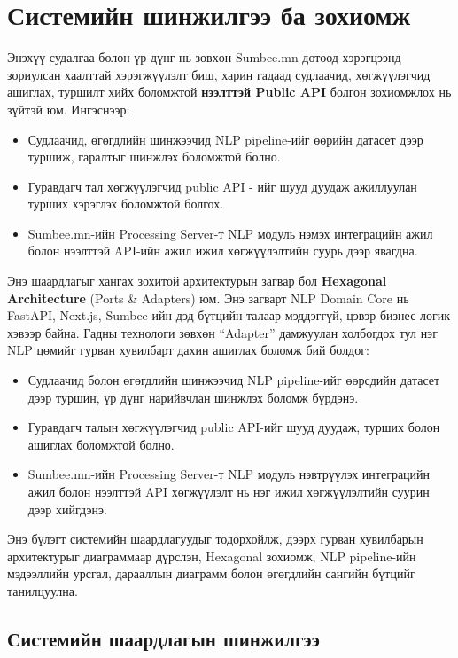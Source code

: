 \chapter{Системийн шинжилгээ ба зохиомж}

 Энэхүү судалгаа болон үр дүнг нь зөвхөн Sumbee.mn дотоод хэрэгцээнд зориулсан хаалттай хэрэгжүүлэлт биш, харин гадаад судлаачид, хөгжүүлэгчид ашиглах, туршилт хийх боломжтой \textbf{нээлттэй Public API} болгон зохиомжлох нь зүйтэй юм. Ингэснээр:

\begin{itemize}
    \item Судлаачид, өгөгдлийн шинжээчид NLP pipeline-ийг өөрийн датасет дээр туршиж, гаралтыг шинжлэх боломжтой болно.
    \item Гуравдагч тал хөгжүүлэгчид public API - ийг шууд дуудаж ажиллуулан турших хэрэглэх боломжтой болгох.
    \item Sumbee.mn-ийн Processing Server-т NLP модуль нэмэх интеграцийн ажил болон нээлттэй API-ийн ажил ижил хөгжүүлэлтийн суурь дээр явагдна.
\end{itemize}

Энэ шаардлагыг хангах зохитой архитектурын загвар бол \textbf{Hexagonal Architecture} (Ports \& Adapters) юм. Энэ загварт NLP Domain Core нь FastAPI, Next.js, Sumbee-ийн дэд бүтцийн талаар мэддэггүй, цэвэр бизнес логик хэвээр байна. Гадны технологи зөвхөн ``Adapter'' дамжуулан холбогдох тул нэг NLP цөмийг гурван хувилбарт дахин ашиглах боломж бий болдог:

\begin{itemize}
    \item Судлаачид болон өгөгдлийн шинжээчид NLP pipeline-ийг өөрсдийн датасет дээр туршин, үр дүнг нарийвчлан шинжлэх боломж бүрдэнэ.
    \item Гуравдагч талын хөгжүүлэгчид public API-ийг шууд дуудаж, турших болон ашиглах боломжтой болно.
    \item Sumbee.mn-ийн Processing Server-т NLP модуль нэвтрүүлэх интеграцийн ажил болон нээлттэй API хөгжүүлэлт нь нэг ижил хөгжүүлэлтийн суурин дээр хийгдэнэ.
\end{itemize}
Энэ бүлэгт системийн шаардлагуудыг тодорхойлж, дээрх гурван хувилбарын архитектурыг диаграммаар дүрслэн, Hexagonal зохиомж, NLP pipeline-ийн мэдээллийн урсгал, дарааллын диаграмм болон өгөгдлийн сангийн бүтцийг танилцуулна.

\section{Системийн шаардлагын шинжилгээ}

